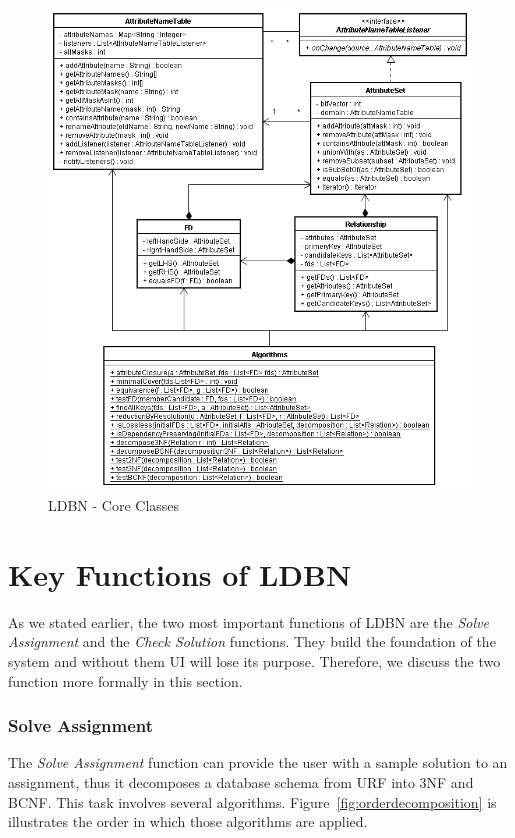 \begin{figure}[htbp]
  \begin{center}
\hspace*{-0.5cm}\includegraphics[width=1.08\textwidth]{./img/uml-std.png}
    \caption{LDBN - Core Classes}
    \label{fig:coreuml}
  \end{center}
\end{figure}



\section{Key Functions of LDBN}
\label{sec:keyfunctions}
As we stated earlier, the two most important functions of LDBN are the \textit{Solve Assignment} and 
the \textit{Check Solution} functions. They build the foundation of the system and
without them UI will lose its purpose. Therefore, we
discuss the two function more formally in this section.

\subsubsection{Solve Assignment}  
The \textit{Solve Assignment} function can provide the user with a sample solution
to an assignment, thus it decomposes a database schema from URF into 3NF and BCNF. This
task involves several algorithms. Figure~\ref{fig:orderdecomposition} is 
illustrates the order in which those algorithms are applied.

